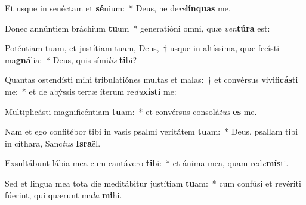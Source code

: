\item Et usque in senéctam et \textbf{sé}nium:~* Deus, ne de\textit{re}\textbf{lín}\textbf{quas} me,
\item Donec annúntiem bráchium \textbf{tu}um~* generatióni omni, quæ \textit{ven}\textbf{tú}\textbf{ra} est:
\item Poténtiam tuam, et justítiam tuam, Deus,~† usque in altíssima, quæ fecísti ma\textbf{gná}lia:~* Deus, quis sími\textit{lis} \textbf{ti}bi?
\item Quantas ostendísti mihi tribulatiónes multas et malas:~† et convérsus vivifi\textbf{cás}ti me:~* et de abýssis terræ íterum re\textit{du}\textbf{xís}\textbf{ti} me:
\item Multiplicásti magnificéntiam \textbf{tu}am:~* et convérsus consolá\textit{tus} \textbf{es} me.
\item Nam et ego confitébor tibi in vasis psalmi veritátem \textbf{tu}am:~* Deus, psallam tibi in cíthara, Sanc\textit{tus} \textbf{Is}\textbf{ra}ël.
\item Exsultábunt lábia mea cum cantávero \textbf{ti}bi:~* et ánima mea, quam red\textit{e}\textbf{mís}ti.
\item Sed et lingua mea tota die meditábitur justítiam \textbf{tu}am:~* cum confúsi et revériti fúerint, qui quærunt ma\textit{la} \textbf{mi}hi.
